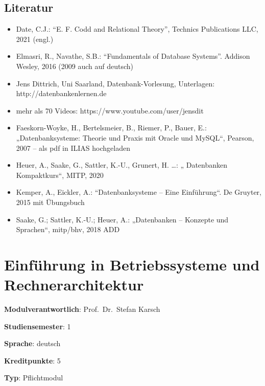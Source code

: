 \hypertarget{literaturpathlabelmi-2017modulbeschreibungen-bachelorba_datenbanken1}{%
\section*{Literatur\label{/mi-2017/modulbeschreibungen-bachelor/BA_Datenbanken1}}\label{literaturpathlabelmi-2017modulbeschreibungen-bachelorba_datenbanken1}}

\begin{itemize}
\tightlist
\item
  Date, C.J.: ``E. F. Codd and Relational Theory'', Technics
  Publications LLC, 2021 (engl.)
\item
  Elmasri, R., Navathe, S.B.: ``Fundamentals of Database Systems''.
  Addison Wesley, 2016 (2009 auch auf deutsch)
\item
  Jens Dittrich, Uni Saarland, Datenbank-Vorlesung, Unterlagen:
  http://datenbankenlernen.de
\item
  mehr als 70 Videos: https://www.youtube.com/user/jensdit
\item
  Faeskorn-Woyke, H., Bertelsmeier, B., Riemer, P., Bauer, E.:
  „Datenbanksysteme: Theorie und Praxis mit Oracle und MySQL``, Pearson,
  2007 -- als pdf in ILIAS hochgeladen
\item
  Heuer, A., Saake, G., Sattler, K.-U., Grunert, H. \ldots: „
  Datenbanken Kompaktkurs``, MITP, 2020
\item
  Kemper, A., Eickler, A.: ``Datenbanksysteme -- Eine Einführung``. De
  Gruyter, 2015 mit Übungsbuch
\item
  Saake, G.; Sattler, K.-U.; Heuer, A.: „Datenbanken -- Konzepte und
  Sprachen``, mitp/bhv, 2018 ADD
\end{itemize}

\hypertarget{einfuxfchrung-in-betriebssysteme-und-rechnerarchitekturpathlabelmi-2017modulbeschreibungen-bachelorba_einfhrunginbetriebssystemeundrechnerarchitektur}{%
\chapter{Einführung in Betriebssysteme und
Rechnerarchitektur\label{/mi-2017/modulbeschreibungen-bachelor/BA_EinfhrunginBetriebssystemeundRechnerarchitektur}}\label{einfuxfchrung-in-betriebssysteme-und-rechnerarchitekturpathlabelmi-2017modulbeschreibungen-bachelorba_einfhrunginbetriebssystemeundrechnerarchitektur}}

\begin{modulHead}
\textbf{Modulverantwortlich}: Prof.~Dr.~Stefan
Karsch
\end{modulHead}
\begin{modulHead}
\textbf{Studiensemester}:
1
\end{modulHead}
\begin{modulHead}
\textbf{Sprache}:
deutsch
\end{modulHead}
\begin{modulHead}
\textbf{Kreditpunkte}:
5
\end{modulHead}
\begin{modulHead}
\textbf{Typ}:
Pflichtmodul
\end{modulHead}


